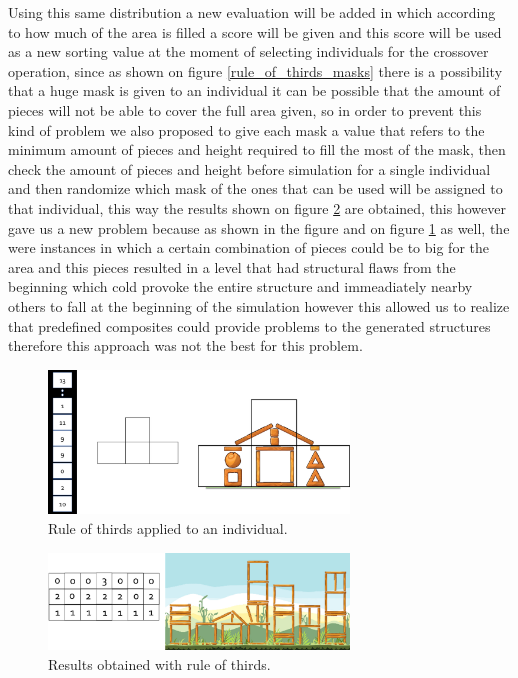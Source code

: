 \documentclass[conference]{IEEEtran}
\begin{document}
    Using this same distribution a new evaluation will be added in which according
    to how much of the area is filled a score will be given and this score will be
    used as a new sorting value at the moment of selecting individuals for the
    crossover operation, since as shown on figure \ref{rule_of_thirds_masks} there
    is a possibility that a huge mask is given to an individual it can be possible
    that the amount of pieces will not be able to cover the full area given, so in
    order to prevent this kind of problem we also proposed to give each mask a
    value that refers to the minimum amount of pieces and height required to fill
    the most of the mask, then check the amount of pieces and height before
    simulation for a single individual and then randomize which mask of the ones
    that can be used will be assigned to that individual, this way the results shown
    on figure \ref{rule_of_thirds_result} are obtained, this however gave us a new
    problem because as shown in the figure and on figure \ref{rule_of_thirds_applied} as well, the were
    instances in which a certain combination of pieces could be to big for the area
    and this pieces resulted in a level that had structural flaws from the beginning
    which cold provoke the entire structure and immeadiately nearby others to fall
    at the beginning of the simulation however this allowed us to realize that predefined 
    composites could provide problems to the generated structures therefore this approach 
    was not the best for this problem.
    
    \begin{figure}[htbp]
        \centerline{\includegraphics[width=80mm]{Images/chromosome_thirds.png}}
        \caption{Rule of thirds applied to an individual.}
        \label{rule_of_thirds_applied}
    \end{figure}
    
    \begin{figure}[htbp]
        \centerline{\includegraphics[width=80mm]{Images/result_example_thirds.png}}
        \caption{Results obtained with rule of thirds.}
        \label{rule_of_thirds_result}
    \end{figure}
    
\end{document}
